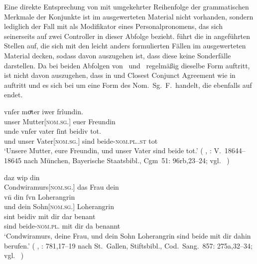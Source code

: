 Eine direkte Entsprechung von  mit umgekehrter Reihenfolge der
grammatischen Merkmale der Konjunkte ist im ausgewerteten Material nicht
vorhanden, sondern lediglich der Fall mit  als Modifikator
eines Personalpronomens, das sich seinerseits auf zwei Controller in dieser
Abfolge bezieht. \citet[96, 145]{askedal1973} führt die in
 angeführten Stellen auf, die sich mit den leicht anders
formulierten Fällen im ausgewerteten Material decken, sodass davon auszugehen
ist, dass diese keine Sonderfälle darstellen. Da bei beiden Abfolgen von
\MascM\ und \FemF\ regelmäßig dieselbe Form  auftritt, ist nicht
davon auszugehen, dass in  und  Closest
Conjunct Agreement wie in  auftritt und es sich bei 
um eine Form des Nom.~Sg.~F.\ handelt, die ebenfalls auf  endet.

\begin{exe}
	\ex \label{ex:askfmbeidiu}
		\begin{xlist}
		\ex \gll vnſer moͮter iwer frîundin. \\
				unser Mutter[\textsc{nom.sg.\FemF}] euer Freundin \\
		\sn \gll unde vnſer vater ſint beidiv tot. \\
				und unser Vater[\textsc{nom.sg.\MascM}] sind
				beide-\textsc{nom.pl.\NeutMF.st} tot \\
			\trans `Unsere Mutter, eure Freundin, und unser Vater sind beide
				tot.'
				(%
					, : V.~18644--18645
					nach München, Bayerische Staatsbibl., Cgm~51: 96rb,23--24;
					vgl.~\cite[259]{maroldschroeder1969}%
				)
			\label{ex:askfmbeidiu_1}
	
		\ex {} daz wip din \\
				Condwiramurs[\textsc{nom.sg.\FemF}] das Frau dein \\
		\sn \gll vn̄ din ſvn Loherangrin \\
				und dein Sohn[\textsc{nom.sg.\MascM}] Loherangrin \\
		\sn \gll sint beidiv mit dir dar benant \\
				sind beide-\textsc{nom.pl.\NeutMF} mit dir da benannt \\
		\trans `Condwiramurs, deine Frau, und dein Sohn Loherangrin
			sind beide mit dir dahin berufen.'
			(%
				, : 781,17--19
				nach St.~Gallen, Stiftsbibl., Cod.~Sang.~857: 275a,32--34;
				vgl.~\cite[785]{knechtschirok2003}%
			)
			\label{ex:askfmbeidiu_2}
	\end{xlist}
\end{exe}

